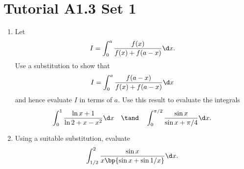 \section{Tutorial A1.3 Set 1}

\begin{problem}
    \begin{enumerate}
        \item Let \[I = \int_0^a \frac{f(x)}{f(x) + f(a-x)} \d x.\] Use a substitution to show that \[I = \int_0^a \frac{f(a - x)}{f(x) + f(a-x)} \d x\] and hence evaluate $I$ in terms of $a$. Use this result to evaluate the integrals \[\int_0^1 \frac{\ln{x+1}}{\ln{2 + x - x^2}} \d x \quad \tand \quad \int_0^{\pi/2} \frac{\sin x}{\sin{x + \pi/4}} \d x.\]
        \item Using a suitable substitution, evaluate \[\int_{1/2}^{2} \frac{\sin x}{x \bp{\sin x + \sin 1/x}} \d x.\]
    \end{enumerate}
\end{problem}
